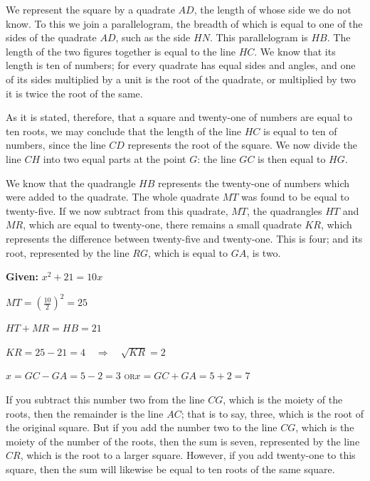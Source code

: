 \documentclass[11pt,a4paper,openany,oneside]{book}
\begin{document}
We represent the square by a quadrate $AD$, the length of whose side we do
not know. To this we join a parallelogram, the breadth of which is equal to
one of the sides of the quadrate $AD$, such as the side $HN$. This
parallelogram is $HB$. The length of the two figures together is equal to the
line $HC$. We know that its length is ten of numbers; for every quadrate has
equal sides and angles, and one of its sides multiplied by a unit is the root
of the quadrate, or multiplied by two it is twice the root of the same.

As it is stated, therefore, that a square and twenty-one of numbers are equal
to ten roots, we may conclude that the length of the line $HC$ is equal to
ten of numbers, since the line $CD$ represents the root of the square. We now
divide the line $CH$ into two equal parts at the point $G$: the line $GC$ is
then equal to $HG$.

We know that the quadrangle $HB$ represents the twenty-one of numbers which
were added to the quadrate. The whole quadrate $MT$ was found to be equal to
twenty-five. If we now subtract from this quadrate, $MT$, the quadrangles
$HT$ and $MR$, which are equal to twenty-one, there remains a small quadrate
$KR$, which represents the difference between twenty-five and twenty-one.
This is four; and its root, represented by the line $RG$, which is equal to
$GA$, is two.

\begin{mathbox}[title={\textbf{Geometric Proof of Case V}}]
\begin{center}
\textbf{Given:} $x^2 + 21 = 10x$

\vspace{0.3cm}

$MT = \left(\frac{10}{2}\right)^2 = 25$

$HT + MR = HB = 21$

$KR = 25 - 21 = 4 \quad\Rightarrow\quad \sqrt{KR} = 2$

\vspace{0.3cm}

$x = GC - GA = 5 - 2 = 3$ \quad\textsc{or}\quad $x = GC + GA = 5 + 2 = 7$
\end{center}
\end{mathbox}

If you subtract this number two from the line $CG$, which is the moiety of
the roots, then the remainder is the line $AC$; that is to say, three, which
is the root of the original square. But if you add the number two to the
line $CG$, which is the moiety of the number of the roots, then the sum is
seven, represented by the line $CR$, which is the root to a larger square.
However, if you add twenty-one to this square, then the sum will likewise be
equal to ten roots of the same square.
\end{document}

